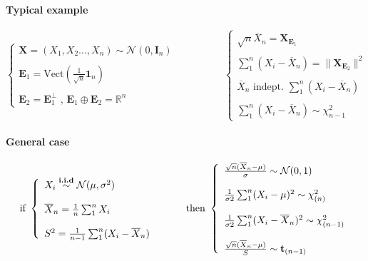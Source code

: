 \documentclass[a4paper,10pt]{article}
\begin{document}
\paragraph{Typical example}
\[
\left\{
\begin{array}{l}
\textbf{X} = (X_1,X_2 ...,X_n) \sim \mathcal{N}(0, \textbf{I}_n) \\ \\
\textbf{E}_1 = \text{Vect}(\frac{1}{\sqrt{n}} \mathbf{1}_n) \\ \\
\textbf{E}_2 = \textbf{E}_1^{\bot} \text{ , } \textbf{E}_1\oplus\textbf{E}_2= \mathbb{R}^n
\end{array}\right.
\hspace{2cm}
\left\{
\begin{array}{l}
 \sqrt{n} \overline{X}_n =  \textbf{X}_{\textbf{E}_1}\\ \\
 \sum^n_1 (X_i- \overline{X}_n) = \| \textbf{X}_{\textbf{E}_2} \|^{2} \\ \\
\overline{X}_n \text{ indept. } \sum^n_1 (X_i- \overline{X}_n) \\ \\
\sum^n_1 (X_i- \overline{X}_n) \sim \chi^2_{n-1}
\end{array}\right. 
\]


\paragraph{General case}
\[
\text{if }
\left\{
\begin{array}{l}
X_i \stackrel{\textbf{i.i.d}}{\sim} \mathcal{N}(\mu, \sigma^2) \\ \\
\overline{X}_n = \frac{1}{n}\sum^n_1 X_i \\ \\
S^2 = \frac{1}{n-1}\sum^n_1 (X_i - \overline{X}_n)  
\end{array}\right.
\hspace{10mm}
\text{then }
\left\{
\begin{array}{l}
\frac{\sqrt{n} (\overline{X}_n - \mu)}{\sigma} \sim \mathcal{N}(0,1) \\ \\
\frac{1}{\sigma2}\sum^n_1 (X_i - \mu)^2 \sim \chi^2_{(n)} \\ \\
\frac{1}{\sigma2}\sum^n_1 (X_i - \overline{X}_n)^2 \sim \chi^2_{(n-1)} \\ \\
\frac{\sqrt{n} (\overline{X}_n - \mu)}{S} \sim \textbf{t}_{(n-1)}
\end{array}\right.
\]
\end{document}
